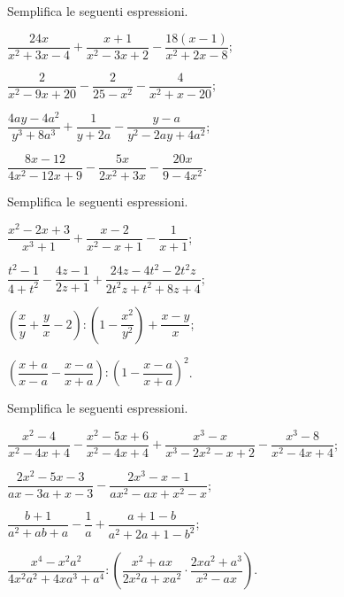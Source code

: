 \begin{esercizio}[\Ast]
\label{ese:14.35}
Semplifica le seguenti espressioni.
\begin{multicols}{2}
\begin{enumeratea}
 \item $\dfrac{24x}{x^{2}+3x-4}+\dfrac{x+1}{x^{2}-3x+2}-\dfrac{18(x-1)}{x^{2}+2x-8}$;
 \item $\dfrac{2}{x^{2}-9x+20}-\dfrac{2}{25-x^{2}}-\dfrac{4}{x^{2}+x-20}$;
 \item $\dfrac{4ay-4a^{2}}{y^{3}+8a^{3}}+\dfrac{1}{y+2a}-\dfrac{y-a}{y^{2}-2ay+4a^{2}}$;
 \item $\dfrac{8x-12}{4x^{2}-12x+9}-\dfrac{5x}{2x^{2}+3x}-\dfrac{20x}{9-4x^{2}}$.
\end{enumeratea}
\end{multicols}
\end{esercizio}

\begin{esercizio}[\Ast]
\label{ese:14.36}
Semplifica le seguenti espressioni.
\begin{multicols}{2}
\begin{enumeratea}
 \item $\dfrac{x^{{2}}-2x+3}{x^{{3}}+1}+\dfrac{x-2}{x^{{2}}-x+1}-\dfrac{1}{x+1}$;
 \item $\dfrac{t^{2}-1}{4+t^{2}}-\dfrac{4z-1}{2z+1}+\dfrac{24z-4t^{2}-2t^{2}z}{2t^{2}z+t^{2}+8z+4}$;
 \item $\left(\dfrac{x}{y}+\dfrac{y}{x}-2\right):\left(1-\dfrac{x^{2}}{y^{2}}\right)+\dfrac{x-y}{x}$;
 \item $\left(\dfrac{x+a}{x-a}-\dfrac{x-a}{x+a}\right):\left(1-\dfrac{x-a}{x+a}\right)^{2}$.
\end{enumeratea}
\end{multicols}
\end{esercizio}

\begin{esercizio}
\label{ese:14.37}
Semplifica le seguenti espressioni.
\begin{enumeratea}
 \item $\dfrac{x^{2}-4}{x^{2}-4x+4}-\dfrac{x^{2}-5x+6}{x^{2}-4x+4}+\dfrac{x^{3}-x}{x^{3}-2x^{2}-x+2}-\dfrac{x^{3}-8}{x^{2}-4x+4}$;
 \item $\dfrac{2x^{2}-5x-3}{ax-3a+x-3}-\dfrac{2x^{3}-x-1}{ax^{2}-ax+x^{2}-x}$;
 \item $\dfrac{b+1}{a^{2}+ab+a}-\dfrac{1}{a}+\dfrac{a+1-b}{a^{2}+2a+1-b^{2}}$;
 \item $\dfrac{x^{4}-x^{2}a^{2}}{4x^{2}a^{2}+4xa^{3}+a^{4}}:\left(\dfrac{x^{2}+ax}{2x^{2}a+xa^{2}}\cdot{\dfrac{2xa^{2}+a^{3}}{x^{2}-ax}}\right)$.
\end{enumeratea}
\end{esercizio}

